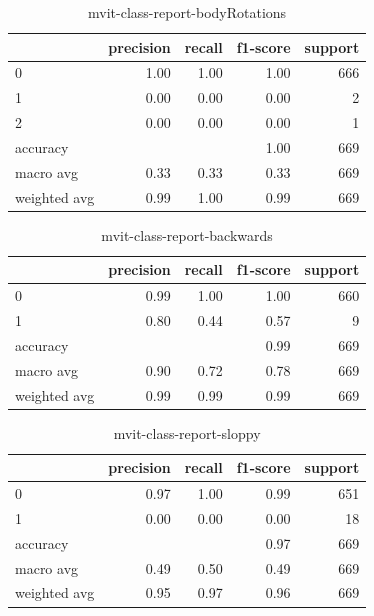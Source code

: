 \begin{table}[h!]
    \begin{tabular}{|l|r|r|r|r|}
                \hline & precision &   recall & f1-score &  support \\ \hline
                0 &      1.00 &      1.00 &     1.00 &      666 \\
                1 &      0.00 &      0.00 &     0.00 &        2 \\
                2 &      0.00 &      0.00 &     0.00 &        1 \\ \hline
         accuracy &           &           &     1.00 &      669 \\
        macro avg &      0.33 &      0.33 &     0.33 &      669 \\
     weighted avg &      0.99 &      1.00 &     0.99 &      669 \\

         \hline
    \end{tabular}
    \caption[Body rotations class report]{mvit-class-report-bodyRotations}
    \label{tbl:mvit-class-report-bodyRotations}
\end{table}

\begin{table}[h!]
    \begin{tabular}{|l|r|r|r|r|}
                \hline & precision &   recall & f1-score &  support \\ \hline
                0 &       0.99 &     1.00 &     1.00 &      660 \\
                1 &       0.80 &     0.44 &     0.57 &        9 \\ \hline
         accuracy &            &          &     0.99 &      669 \\
        macro avg &       0.90 &     0.72 &     0.78 &      669 \\
     weighted avg &       0.99 &     0.99 &     0.99 &      669 \\
         \hline
    \end{tabular}
    \caption[Backwards class report]{mvit-class-report-backwards}
    \label{tbl:mvit-class-report-backwards}
\end{table}

\begin{table}[h!]
    \begin{tabular}{|l|r|r|r|r|}
                \hline & precision &   recall & f1-score &  support \\ \hline
                0 &      0.97 &     1.00 &     0.99 &      651 \\
                1 &      0.00 &     0.00 &     0.00 &       18 \\
         accuracy &           &          &     0.97 &      669 \\ \hline
        macro avg &      0.49 &     0.50 &     0.49 &      669 \\
     weighted avg &      0.95 &     0.97 &     0.96 &      669 \\
         \hline
    \end{tabular}
    \caption[Sloppy class report]{mvit-class-report-sloppy}
    \label{tbl:mvit-class-report-sloppy}
\end{table}


